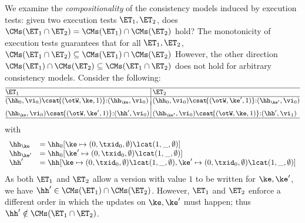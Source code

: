 We examine the \emph{compositionality} of the consistency models induced by execution tests:  
\ie given two execution tests $\ET_1, \ET_2$, does 
$\CMs(\ET_1 \cap \ET_2) = \CMs(\ET_1) \cap \CMs(\ET_2)$ hold? 
The monotonicity of execution tests guarantees that 
 for all $\ET_1, \ET_2$, \( \CMs(\ET_1 \cap \ET_2) \subseteq \CMs(\ET_1) \cap \CMs(\ET_2) \) 
However, the other direction \( \CMs(\ET_1) \cap \CMs(\ET_2) \subseteq \CMs(\ET_1 \cap \ET_2) \) does not hold for arbitrary consistency models.
Consider the following:
\[
\small
\begin{array}{@{}l @{\hspace{2pt}} | @{\hspace{2pt}} l@{}}
    \hline
    \ET_1 & \ET_2 \\
%    
    \hline
    (\hh_{0}, \vi_{0}) \csat\! \{(\otW, \ke, 1)\} {:} ( \hh_{\ke}, \vi_{0})
    &
    (\hh_{0}, \vi_{0}) \csat\! \{(\otW, \ke', 1)\} {:} ( \hh_{\ke'}, \vi_{0}) 
    \vspace{-5pt}\\\\
    (\hh_{\ke}, \vi_{0}) \csat  \!\{(\otW, \ke', 1)\} {:} (\hh',\vi_{0}) 
    &
    (\hh_{\ke'}, \vi_{0}) \csat \!\{(\otW, \ke, 1)\} {:} (\hh',\vi_{1}) 
    \\
\hline
\end{array}
\]
with 
\[
\begin{array}{ll}
    \hh_{\ke} & = \hh_{0}[\ke \mapsto (0, \txid_{0}, \emptyset) \lcat (1, \_, \emptyset)] \\
    \hh_{\ke'} & = \hh_{0}[\ke' \mapsto (0, \txid_{0}, \emptyset) \lcat (1, \_, \emptyset)] \\
    \hh' & = \hh[\ke \mapsto (0, \txid_{0}, \emptyset) \lcat (1, \_, \emptyset) 
                ,\ke' \mapsto (0, \txid_{0}, \emptyset) \lcat (1, \_, \emptyset)] \\
\end{array}
\]
As both $\ET_1$ and $\ET_2$ allow a version with value $1$ to be written for 
$\ke, \ke'$,  we have $\hh' \in \CMs(\ET_1) \cap \CMs(\ET_2)$. 
However, $\ET_1$ and $\ET_2$ enforce a different order in which the updates on $\ke, \ke'$ must happen; 
thus $\hh' \notin \CMs(\ET_1 \cap \ET_2)$. 

